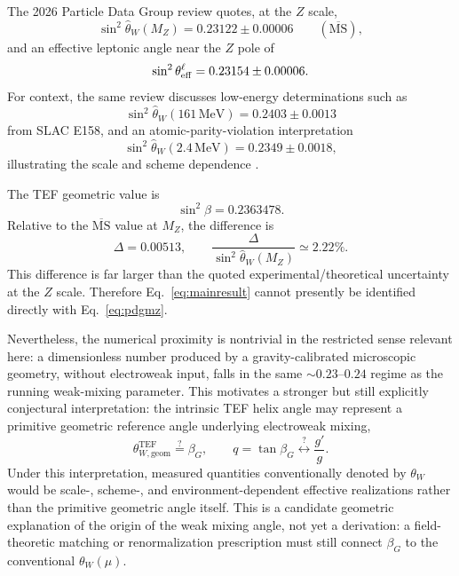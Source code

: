 \documentclass[aps,prd,reprint,nofootinbib,floatfix]{revtex4-2}
\newcommand{\TEF}{\mathrm{TEF}}
\begin{document}
The 2026 Particle Data Group review quotes, at the $Z$ scale,
\begin{equation}
\sin^2\widehat\theta_W(M_Z)=0.23122\pm0.00006
\qquad (\overline{\mathrm{MS}}),
\label{eq:pdgmz}
\end{equation}
and an effective leptonic angle near the $Z$ pole of
\begin{equation}
\sin^2\theta_{\rm eff}^{\ell}=0.23154\pm0.00006.
\end{equation}
For context, the same review discusses low-energy determinations such as
\begin{equation}
\sin^2\widehat\theta_W(161\,\mathrm{MeV})=0.2403\pm0.0013
\end{equation}
from SLAC E158, and an atomic-parity-violation interpretation
\begin{equation}
\sin^2\widehat\theta_W(2.4\,\mathrm{MeV})=0.2349\pm0.0018,
\end{equation}
illustrating the scale and scheme dependence \cite{PDG2026EW}.

The TEF geometric value is
\begin{equation}
\sin^2\beta=0.2363478.
\end{equation}
Relative to the $\overline{\mathrm{MS}}$ value at $M_Z$, the difference is
\begin{equation}
\Delta=0.00513,
\qquad
\frac{\Delta}{\sin^2\widehat\theta_W(M_Z)}\simeq2.22\%.
\end{equation}
This difference is far larger than the quoted experimental/theoretical uncertainty at the $Z$ scale.  Therefore Eq.~\eqref{eq:mainresult} cannot presently be identified directly with Eq.~\eqref{eq:pdgmz}.

Nevertheless, the numerical proximity is nontrivial in the restricted sense relevant here: a dimensionless number produced by a gravity-calibrated microscopic geometry, without electroweak input, falls in the same $\sim0.23$--$0.24$ regime as the running weak-mixing parameter.  This motivates a stronger but still explicitly conjectural interpretation: the intrinsic TEF helix angle may represent a primitive geometric reference angle underlying electroweak mixing,
\begin{equation}
\boxed{\theta_{W,\mathrm{geom}}^{\TEF}\stackrel{?}{=}\beta_G},
\qquad
q=\tan\beta_G \stackrel{?}{\longleftrightarrow} \frac{g'}{g}.
\label{eq:candidate}
\end{equation}
Under this interpretation, measured quantities conventionally denoted by $\theta_W$ would be scale-, scheme-, and environment-dependent effective realizations rather than the primitive geometric angle itself.  This is a candidate geometric explanation of the origin of the weak mixing angle, not yet a derivation: a field-theoretic matching or renormalization prescription must still connect $\beta_G$ to the conventional $\theta_W(\mu)$.
\end{document}
